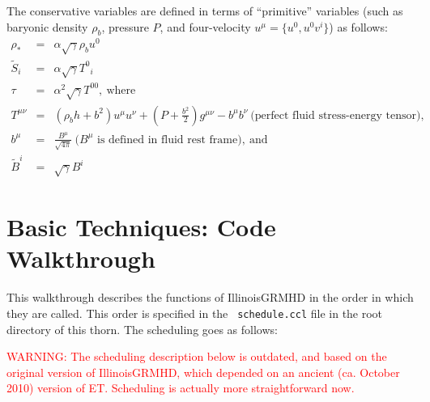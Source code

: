 \documentclass[showpacs,amsmath,amssymb,prd]{revtex4}
\newcommand{\beqn}{\begin{eqnarray}}
\newcommand{\eeqn}{\end{eqnarray}}
\begin{document}
The conservative variables are defined in terms of ``primitive''
variables (such as baryonic density $\rho_b$, pressure $P$, and
four-velocity $u^{\mu}=\{u^0,u^0 v^i\}$) as follows:
\beqn
\rho_* &=& \alpha \sqrt{\gamma} \rho_b u^0 \\
\tilde{S}_i &=&  \alpha \sqrt{\gamma} T^0{}_i \\
\tau &=& \alpha^2 \sqrt{\gamma} T^{00}, \ \text{where} \\
T^{\mu \nu} &=& (\rho_b h +b^2) u^{\mu} u^{\nu} + \left( P +
\frac{b^2}{2} \right) g^{\mu \nu} - b^{\mu} b^{\nu}\ \text{(perfect
  fluid stress-energy tensor)}, \\
b^{\mu} &=& \frac{B^{\mu}}{\sqrt{4\pi}} \ \text{($B^{\mu}$ is defined in
  fluid rest frame)}, \ \text{and}  \\
\tilde{B}^i &=& \sqrt{\gamma} B^i
\eeqn

\section{Basic Techniques: Code Walkthrough}
This walkthrough describes the functions of IllinoisGRMHD in the order
in which they are called. This order is specified in the {\tt
  schedule.ccl} file in the root directory of this thorn. The
scheduling goes as follows:

\textcolor{red}{WARNING: The scheduling description below is
  outdated, and based on the original version of IllinoisGRMHD, which
  depended on an ancient (ca. October 2010) version of ET. Scheduling
  is actually more straightforward now.}
\end{document}
